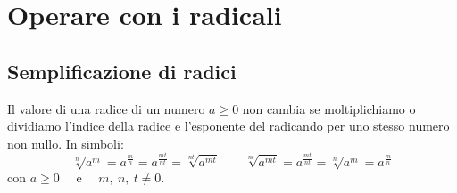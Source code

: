 \section{Operare con i radicali}
\label{sec:radicali_operare}

\subsection{Semplificazione di radici}

\begin{teorema}{}{}
Il valore di una radice di un numero \(a \geqslant 0\) non cambia se 
moltiplichiamo o dividiamo l'indice della radice e l'esponente del 
radicando per uno stesso numero non nullo. 
In simboli: 
\[\sqrt[n]{a^m}=a^{\frac{m}{n}}=a^{\frac{mt}{nt}}=\sqrt[nt]{a^{mt}} \qquad
  \sqrt[nt]{a^{mt}}=a^{\frac{mt}{nt}}=\sqrt[n]{a^m}=a^{\frac{m}{n}}\]
con \(a\geqslant 0\) ~~e~~ \(m,~n,~t \neq 0\).
\end{teorema}

